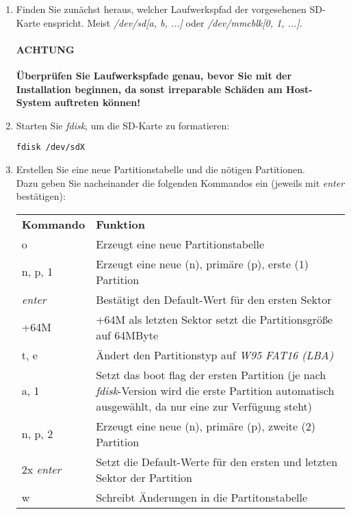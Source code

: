 \begin{enumerate}

\item Finden Sie zunächst heraus, welcher Laufwerkspfad der vorgesehenen SD-Karte enspricht. Meist \textit{/dev/sd[a, b, ...]} oder \textit{/dev/mmcblk[0, 1, ...]}.

{\paragraph{\color{red} ACHTUNG} \textbf{\color{red} Überprüfen Sie Laufwerkspfade genau, bevor Sie mit der Installation beginnen, da sonst irreparable Schäden am Host-System auftreten können!}}

\item Starten Sie \emph{fdisk}, um die SD-Karte zu formatieren:

\begin{lstlisting}
fdisk /dev/sdX
\end{lstlisting}

\item Erstellen Sie eine neue Partitionstabelle und die nötigen Partitionen.\\
Dazu geben Sie nacheinander die folgenden Kommandos ein (jeweils mit \textit{enter} bestätigen):

\begin{longtabu} to \textwidth {
	X[1]
    X[3]}
\textbf{Kommando} & \textbf{Funktion}\\
o & Erzeugt eine neue Partitionstabelle\\
n, p, 1 & Erzeugt eine neue (n), primäre (p), erste (1) Partition\\
\textit{enter} & Bestätigt den Default-Wert für den ersten Sektor\\
+64M & +64M als letzten Sektor setzt die Partitionsgröße auf 64MByte\\
t, e & Ändert den Partitionstyp auf \textit{W95 FAT16 (LBA)}\\
a, 1 & Setzt das boot flag der ersten Partition (je nach \emph{fdisk}-Version wird die erste Partition automatisch ausgewählt, da nur eine zur Verfügung steht)\\
n, p, 2 & Erzeugt eine neue (n), primäre (p), zweite (2) Partition\\
2x \textit{enter} & Setzt die Default-Werte für den ersten und letzten Sektor der Partition\\
w & Schreibt Änderungen in die Partitonstabelle
\end{longtabu}


\end{enumerate}
